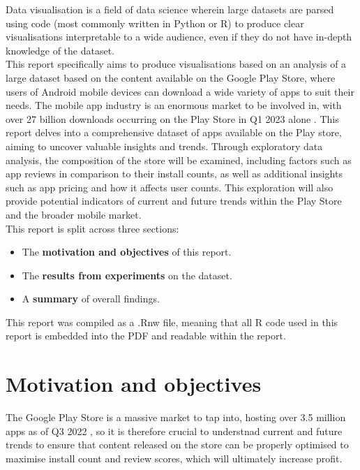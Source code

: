 \documentclass[12pt]{report}\usepackage[]{graphicx}\usepackage[]{xcolor}
\begin{document}
Data visualisation is a field of data science wherein large datasets are parsed
using code (most commonly written in Python or R) to produce clear visualisations
interpretable to a wide audience, even if they do not have in-depth knowledge
of the dataset. \\

\noindent This report specifically aims to produce visualisations based on an
analysis of a large dataset based on the content available on the Google Play Store, 
where users of Android mobile devices can download a wide variety of apps to suit their needs. 
The mobile app industry is an enormous market to be involved in, with over 27 billion 
downloads occurring on the Play Store in Q1 2023 alone \autocite{PlayStoreDLs}. This report delves 
into a comprehensive dataset of apps available on the Play store, aiming to uncover valuable insights 
and trends. Through exploratory data analysis, the composition of the store will 
be examined, including factors such as app reviews in comparison to their install counts, as well as 
additional insights such as app pricing and how it affects user counts.
This exploration will also provide potential indicators of current and future trends within the Play Store
and the broader mobile market.\\



\noindent This report is split across three sections:
\begin{itemize}
    \item The \textbf{motivation and objectives} of this report.
    \item The \textbf{results from experiments} on the dataset.
    \item A \textbf{summary} of overall findings.
\end{itemize}

\noindent This report was compiled as a .Rnw file, meaning that all R code used in this
report is embedded into the PDF and readable within the report.

\pagebreak

\chapter{Motivation and objectives}


The Google Play Store is a massive market to tap into, hosting over 3.5 million apps as of Q3 2022 
\autocite{PlayStoreAppCount}, so it is therefore crucial to understnad current and future trends
to ensure that content released on the store can be properly optimised to maximise install count and 
review scores, which will ultimately increase profit.\\
\end{document}
